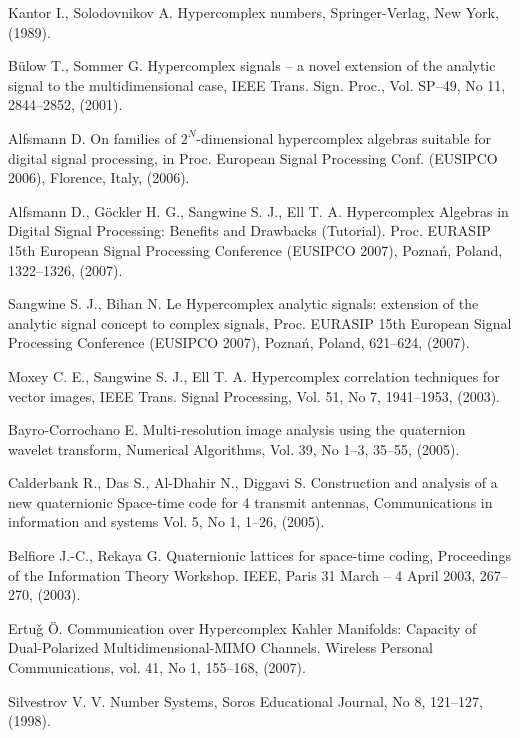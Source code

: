 \documentclass{jtacs}
\numberwithin{equation}{section}
\begin{document}
\begin{thebibliography}{26}

 Kantor I., Solodovnikov A. Hypercomplex numbers, Springer-Verlag, New York, (1989).

 B\"{u}low T., Sommer G. Hypercomplex signals – a novel extension of the analytic signal to the
multidimensional case, IEEE Trans. Sign. Proc., Vol. SP--49, No 11, 2844--2852, (2001).

 Alfsmann D. On families of $2^{N}$-dimensional hypercomplex algebras suitable for digital signal
processing, in Proc. European Signal Processing Conf. (EUSIPCO 2006), Florence, Italy,
(2006).

 Alfsmann D., G\"{o}ckler H. G., Sangwine S. J., Ell T. A. Hypercomplex Algebras in Digital Signal
Processing: Benefits and Drawbacks (Tutorial). Proc. EURASIP 15th European Signal Processing
Conference (EUSIPCO 2007), Pozna\'{n}, Poland, 1322--1326, (2007).

 Sangwine S. J., Bihan N. Le Hypercomplex analytic signals: extension of the analytic signal
concept to complex signals, Proc. EURASIP 15th European Signal Processing Conference
(EUSIPCO 2007), Pozna\'{n}, Poland, 621--624, (2007).

 Moxey C. E., Sangwine S. J., Ell T. A. Hypercomplex correlation techniques for vector images,
IEEE Trans. Signal Processing, Vol. 51, No 7, 1941--1953, (2003).

 Bayro-Corrochano E. Multi-resolution image analysis using the quaternion wavelet transform,
Numerical Algorithms, Vol. 39, No 1--3, 35--55, (2005).

 Calderbank R., Das S., Al-Dhahir N., Diggavi S. Construction and analysis of a new quaternionic
Space-time code for 4 transmit antennas, Communications in information and systems Vol. 5, No 1, 1--26, (2005).

 Belfiore J.-C., Rekaya G. Quaternionic lattices for space-time coding, Proceedings of the Information
Theory Workshop. IEEE, Paris 31 March -- 4 April 2003, 267--270, (2003).

 Ertu\v{g} \"{O}. Communication over Hypercomplex Kahler Manifolds: Capacity of Dual-Polarized
Multidimensional-MIMO Channels. Wireless Personal Communications, vol. 41, No 1, 155--168, (2007).

Silvestrov V. V. Number Systems, Soros Educational Journal, No 8, 121--127, (1998).


\end{thebibliography}
\end{document}
